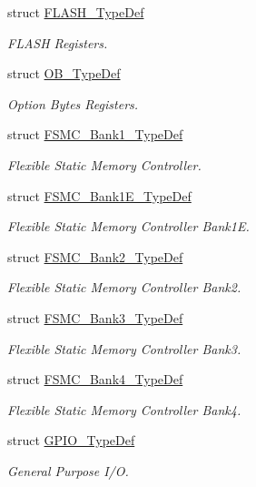 \begin{DoxyCompactItemize}
struct \mbox{\hyperlink{struct_f_l_a_s_h___type_def}{F\+L\+A\+S\+H\+\_\+\+Type\+Def}}
\begin{DoxyCompactList}\small\item\em F\+L\+A\+SH Registers. \end{DoxyCompactList}\item 
struct \mbox{\hyperlink{struct_o_b___type_def}{O\+B\+\_\+\+Type\+Def}}
\begin{DoxyCompactList}\small\item\em Option Bytes Registers. \end{DoxyCompactList}\item 
struct \mbox{\hyperlink{struct_f_s_m_c___bank1___type_def}{F\+S\+M\+C\+\_\+\+Bank1\+\_\+\+Type\+Def}}
\begin{DoxyCompactList}\small\item\em Flexible Static Memory Controller. \end{DoxyCompactList}\item 
struct \mbox{\hyperlink{struct_f_s_m_c___bank1_e___type_def}{F\+S\+M\+C\+\_\+\+Bank1\+E\+\_\+\+Type\+Def}}
\begin{DoxyCompactList}\small\item\em Flexible Static Memory Controller Bank1E. \end{DoxyCompactList}\item 
struct \mbox{\hyperlink{struct_f_s_m_c___bank2___type_def}{F\+S\+M\+C\+\_\+\+Bank2\+\_\+\+Type\+Def}}
\begin{DoxyCompactList}\small\item\em Flexible Static Memory Controller Bank2. \end{DoxyCompactList}\item 
struct \mbox{\hyperlink{struct_f_s_m_c___bank3___type_def}{F\+S\+M\+C\+\_\+\+Bank3\+\_\+\+Type\+Def}}
\begin{DoxyCompactList}\small\item\em Flexible Static Memory Controller Bank3. \end{DoxyCompactList}\item 
struct \mbox{\hyperlink{struct_f_s_m_c___bank4___type_def}{F\+S\+M\+C\+\_\+\+Bank4\+\_\+\+Type\+Def}}
\begin{DoxyCompactList}\small\item\em Flexible Static Memory Controller Bank4. \end{DoxyCompactList}\item 
struct \mbox{\hyperlink{struct_g_p_i_o___type_def}{G\+P\+I\+O\+\_\+\+Type\+Def}}
\begin{DoxyCompactList}\small\item\em General Purpose I/O. \end{DoxyCompactList}\item 

\end{DoxyCompactItemize}

